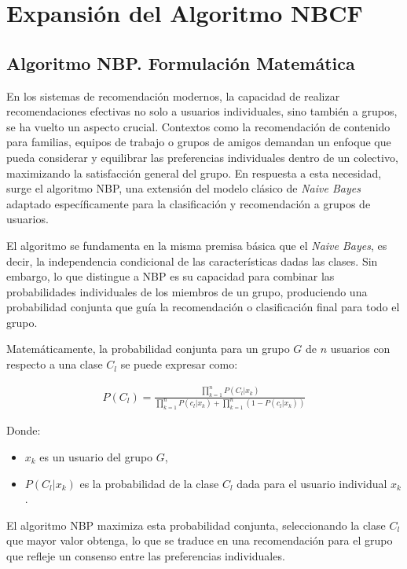 \documentclass[twocolumn, fontsize=10pt]{article}
\begin{document}
\section{Expansión del Algoritmo NBCF}

\subsection{Algoritmo NBP. Formulación Matemática}
En los sistemas de recomendación modernos, la 
capacidad de realizar recomendaciones efectivas 
no solo a usuarios individuales, sino también a grupos, 
se ha vuelto un aspecto crucial. Contextos como la 
recomendación de contenido para familias, equipos de 
trabajo o grupos de amigos demandan un enfoque que 
pueda considerar y equilibrar las preferencias 
individuales dentro de un colectivo, maximizando la 
satisfacción general del grupo. En respuesta a esta 
necesidad, surge el algoritmo NBP, una extensión del 
modelo clásico de \textit{Naive Bayes} adaptado 
específicamente para la clasificación y recomendación 
a grupos de usuarios.

El algoritmo se fundamenta en la misma premisa básica 
que el \textit{Naive Bayes}, es decir, la independencia 
condicional de las características dadas las clases. 
Sin embargo, lo que distingue a NBP es su capacidad 
para combinar las probabilidades individuales de los 
miembros de un grupo, produciendo una probabilidad 
conjunta que guía la recomendación o clasificación 
final para todo el grupo.

Matemáticamente, la probabilidad conjunta para un 
grupo $G$ de $n$ usuarios con respecto a una clase $C_l$ 
se puede expresar como:

\begin{multline}
    P(C_l) = \frac{\prod_{k=1}^{n} P(C_l|x_k)}{\prod_{k=1}^{n} P(c_l|x_k) + \prod_{k=1}^{n} (1-P(c_l|x_k))}
\end{multline} \cite{nbp}

Donde:
\begin{itemize}
    \item $x_k$ es un usuario del grupo $G$,
    \item $P(C_l|x_k)$ es la probabilidad de la 
    clase $C_l$ dada para el usuario individual $x_k$. 
\end{itemize} 

El algoritmo NBP maximiza esta probabilidad conjunta, 
seleccionando la clase $C_l$ que mayor valor obtenga, 
lo que se traduce en una recomendación para el grupo 
que refleje un consenso entre las preferencias 
individuales.
\end{document}
